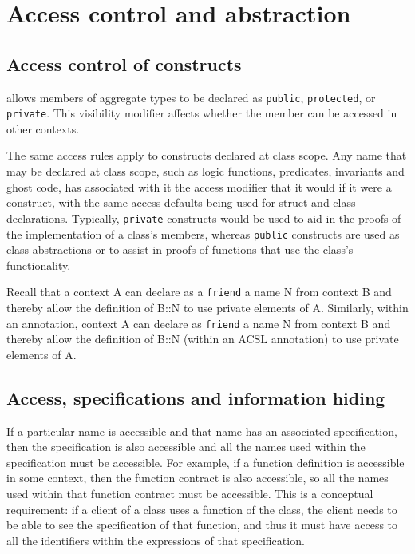 \section{Access control and abstraction}
\label{sec:access}


\subsection{Access control of \NAME{} constructs}

\lang{} allows members of aggregate types to be declared as \lstinline|public|, \lstinline|protected|, or \lstinline|private|. This visibility modifier affects whether the member can be accessed in other contexts. 

The same access rules apply to \NAME{} constructs declared at class scope. Any name that may be declared at class scope, such as logic functions, predicates, invariants and ghost code, has associated with it the access modifier that it would if it were a \lang{}
construct, with the same access defaults being used for struct and class declarations. Typically, \lstinline|private| \NAME{}
constructs would be used to aid in the proofs of the implementation of a class's members, whereas 
\lstinline|public| \NAME{} constructs are used as class abstractions or to assist in proofs of functions that use the class's
functionality.

Recall that a \lang{} context A can declare as a \lstinline|friend| a name N from context B and thereby allow 
the definition of B::N to use private elements of A. Similarly, within an \NAME{} annotation, context A can declare as
\lstinline|friend| a \NAME{} name N from context B and thereby allow 
the definition of B::N (within an ACSL annotation) to use private elements of A.

 
\subsection{Access, specifications and information hiding}

If a particular \lang{} name is accessible and that name has an associated \NAME{} specification, then the specification is also accessible and all the names used within the specification must be
accessible. For example, if a function definition is accessible in some context, then the function contract is also accessible, so all the 
names used within that function contract must be accessible. This is a conceptual requirement: if a client of a class uses a function of the class, the client needs to be able to see the specification of that function, and thus it must have access to all the identifiers 
within the expressions of that specification.

